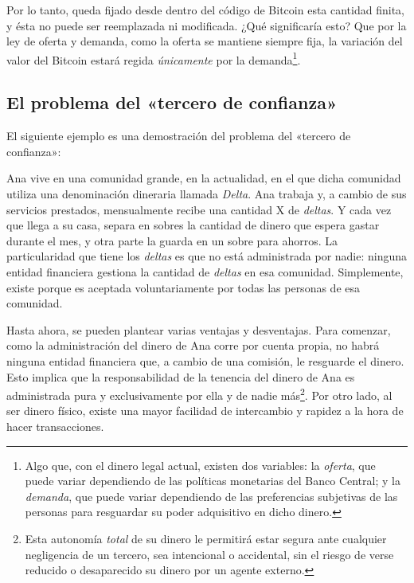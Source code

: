 \documentclass[12pt,a4paper,twoside]{book}
\begin{document}
Por lo tanto, queda fijado desde dentro del código de Bitcoin esta cantidad finita, y ésta no puede ser reemplazada ni modificada. ¿Qué significaría esto? Que por la ley de oferta y demanda, como la oferta se mantiene siempre fija, la variación del valor del Bitcoin estará regida \textit{únicamente} por la demanda\footnote{Algo que, con el dinero legal actual, existen dos variables: la \textit{oferta}, que puede variar dependiendo de las políticas monetarias del Banco Central; y la \textit{demanda}, que puede variar dependiendo de las preferencias subjetivas de las personas para resguardar su poder adquisitivo en dicho dinero.}.

\subsection{El problema del «tercero de confianza»}
El siguiente ejemplo es una demostración del problema del «tercero de confianza»:

Ana vive en una comunidad grande, en la actualidad, en el que dicha comunidad utiliza una denominación dineraria llamada \textit{Delta}. Ana trabaja y, a cambio de sus servicios prestados, mensualmente recibe una cantidad X de \textit{deltas}. Y cada vez que llega a su casa, separa en sobres la cantidad de dinero que espera gastar durante el mes, y otra parte la guarda en un sobre para ahorros. La particularidad que tiene los \textit{deltas} es que no está administrada por nadie: ninguna entidad financiera gestiona la cantidad de \textit{deltas} en esa comunidad. Simplemente, existe porque es aceptada voluntariamente por todas las personas de esa comunidad.

Hasta ahora, se pueden plantear varias ventajas y desventajas. Para comenzar, como la administración del dinero de Ana corre por cuenta propia, no habrá ninguna entidad financiera que, a cambio de una comisión, le resguarde el dinero. Esto implica que la responsabilidad de la tenencia del dinero de Ana es administrada pura y exclusivamente por ella y de nadie más\footnote{Esta autonomía \textit{total} de su dinero le permitirá estar segura ante cualquier negligencia de un tercero, sea intencional o accidental, sin el riesgo de verse reducido o desaparecido su dinero por un agente externo.}. Por otro lado, al ser dinero físico, existe una mayor facilidad de intercambio y rapidez a la hora de hacer transacciones.
\end{document}
